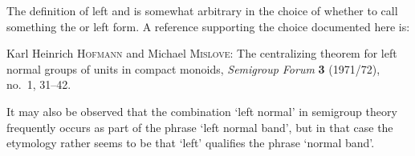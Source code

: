 \documentclass[12pt]{article}
\begin{document}
The definition of left and 
  
is somewhat arbitrary in the choice of whether to call 
something the  or left form. 
A reference supporting the choice documented here is:
\begin{thebibliography}{8}
  Karl Heinrich \textsc{Hofmann} and Michael \textsc{Mislove}: 
  The centralizing theorem for left normal groups of units in 
  compact monoids,
  \textit{Semigroup Forum} \textbf{3} (1971/72),  no.~1, 31--42. 
\end{thebibliography}
It may also be observed that the combination `left normal' in semigroup 
theory frequently occurs as part of the phrase `left normal band', 
but in that case the etymology rather seems to be that `left' qualifies 
the phrase `normal band'.

\end{document}
